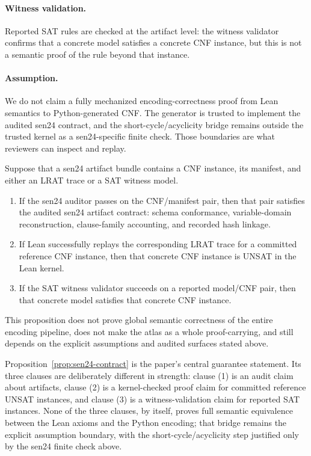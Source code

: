 \paragraph{Witness validation.}
Reported SAT rules are checked at the artifact level: the witness validator confirms that a concrete model satisfies a concrete CNF instance, but this is not a semantic proof of the rule beyond that instance.

\paragraph{Assumption.}
We do not claim a fully mechanized encoding-correctness proof from Lean semantics to Python-generated CNF. The generator is trusted to implement the audited sen24 contract, and the short-cycle/acyclicity bridge remains outside the trusted kernel as a sen24-specific finite check. Those boundaries are what reviewers can inspect and replay.

\begin{proposition}
\label{prop:sen24-contract}
Suppose that a sen24 artifact bundle contains a CNF instance, its manifest, and either an LRAT trace or a SAT witness model.
\begin{enumerate}[leftmargin=*]
  \item If the sen24 auditor passes on the CNF/manifest pair, then that pair satisfies the audited sen24 artifact contract: schema conformance, variable-domain reconstruction, clause-family accounting, and recorded hash linkage.
  \item If Lean successfully replays the corresponding LRAT trace for a committed reference CNF instance, then that concrete CNF instance is UNSAT in the Lean kernel.
  \item If the SAT witness validator succeeds on a reported model/CNF pair, then that concrete model satisfies that concrete CNF instance.
\end{enumerate}
This proposition does not prove global semantic correctness of the entire encoding pipeline, does not make the atlas as a whole proof-carrying, and still depends on the explicit assumptions and audited surfaces stated above.
\end{proposition}

Proposition~\ref{prop:sen24-contract} is the paper's central guarantee statement.
Its three clauses are deliberately different in strength: clause (1) is an audit claim about artifacts, clause (2) is a kernel-checked proof claim for committed reference UNSAT instances, and clause (3) is a witness-validation claim for reported SAT instances.
None of the three clauses, by itself, proves full semantic equivalence between the Lean axioms and the Python encoding; that bridge remains the explicit assumption boundary, with the short-cycle/acyclicity step justified only by the sen24 finite check above.

